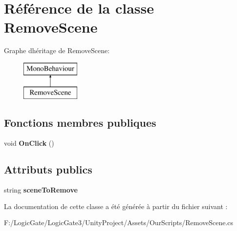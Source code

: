\hypertarget{class_remove_scene}{}\section{Référence de la classe Remove\+Scene}
\label{class_remove_scene}
Graphe d\textquotesingle{}héritage de Remove\+Scene\+:\begin{figure}[H]
\begin{center}
\leavevmode
\includegraphics[height=2.000000cm]{class_remove_scene}
\end{center}
\end{figure}
\subsection*{Fonctions membres publiques}
\begin{DoxyCompactItemize}
\item 
\mbox{\label{class_remove_scene_af485f2d8ac0b9b72d539a2f2ce7143e6}} 
void {\bfseries On\+Click} ()
\end{DoxyCompactItemize}
\subsection*{Attributs publics}
\begin{DoxyCompactItemize}
\item 
\mbox{\label{class_remove_scene_a0a170dd96a9eebb94e0f9fbaeda7ad51}} 
string {\bfseries scene\+To\+Remove}
\end{DoxyCompactItemize}


La documentation de cette classe a été générée à partir du fichier suivant \+:\begin{DoxyCompactItemize}
\item 
F\+:/\+Logic\+Gate/\+Logic\+Gate3/\+Unity\+Project/\+Assets/\+Our\+Scripts/Remove\+Scene.\+cs\end{DoxyCompactItemize}
